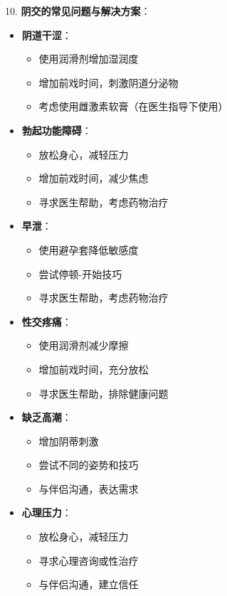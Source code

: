 \documentclass[12pt,UTF8]{ctexbook}
\begin{document}
10. \textbf{阴交的常见问题与解决方案}：
\begin{itemize}
	\item \textbf{阴道干涩}：
	\begin{itemize}
		\item 使用润滑剂增加湿润度
		\item 增加前戏时间，刺激阴道分泌物
		\item 考虑使用雌激素软膏（在医生指导下使用）
	\end{itemize}
	\item \textbf{勃起功能障碍}：
	\begin{itemize}
		\item 放松身心，减轻压力
		\item 增加前戏时间，减少焦虑
		\item 寻求医生帮助，考虑药物治疗
	\end{itemize}
	\item \textbf{早泄}：
	\begin{itemize}
		\item 使用避孕套降低敏感度
		\item 尝试停顿-开始技巧
		\item 寻求医生帮助，考虑药物治疗
	\end{itemize}
	\item \textbf{性交疼痛}：
	\begin{itemize}
		\item 使用润滑剂减少摩擦
		\item 增加前戏时间，充分放松
		\item 寻求医生帮助，排除健康问题
	\end{itemize}
	\item \textbf{缺乏高潮}：
	\begin{itemize}
		\item 增加阴蒂刺激
		\item 尝试不同的姿势和技巧
		\item 与伴侣沟通，表达需求
	\end{itemize}
	\item \textbf{心理压力}：
	\begin{itemize}
		\item 放松身心，减轻压力
		\item 寻求心理咨询或性治疗
		\item 与伴侣沟通，建立信任
	\end{itemize}
\end{itemize}
\end{document}
